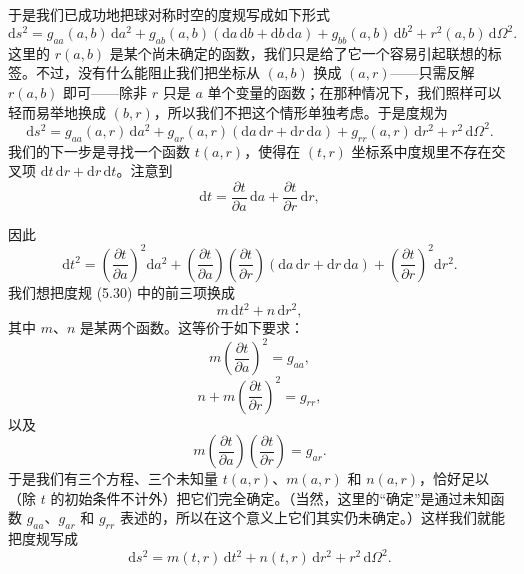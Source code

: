 于是我们已成功地把球对称时空的度规写成如下形式
\begin{equation*}
\mathrm{d}s^2 = g_{aa}(a, b)\,\mathrm{d}a^2 + g_{ab}(a, b)(\mathrm{d}a\,\mathrm{d}b + \mathrm{d}b\,\mathrm{d}a) + g_{bb}(a, b)\,\mathrm{d}b^2 + r^2(a, b)\,\mathrm{d}\Omega^2.
\tag{5.29}
\end{equation*}
这里的 $r(a, b)$ 是某个尚未确定的函数，我们只是给了它一个容易引起联想的标签。不过，没有什么能阻止我们把坐标从 $(a, b)$ 换成 $(a, r)$——只需反解 $r(a, b)$ 即可——除非 $r$ 只是 $a$ 单个变量的函数；在那种情况下，我们照样可以轻而易举地换成 $(b, r)$，所以我们不把这个情形单独考虑。于是度规为
\begin{equation*}
\mathrm{d}s^2 = g_{aa}(a, r)\,\mathrm{d}a^2 + g_{ar}(a, r)(\mathrm{d}a\,\mathrm{d}r + \mathrm{d}r\,\mathrm{d}a) + g_{rr}(a, r)\,\mathrm{d}r^2 + r^2\,\mathrm{d}\Omega^2.
\tag{5.30}
\end{equation*}
我们的下一步是寻找一个函数 $t(a, r)$，使得在 $(t, r)$ 坐标系中度规里不存在交叉项 $\mathrm{d}t\,\mathrm{d}r + \mathrm{d}r\,\mathrm{d}t$。注意到
\begin{equation*}
\mathrm{d}t = \frac{\partial t}{\partial a}\,\mathrm{d}a + \frac{\partial t}{\partial r}\,\mathrm{d}r,
\tag{5.31}
\end{equation*}

因此
\begin{equation*}
\mathrm{d}t^2 = \left(\frac{\partial t}{\partial a}\right)^{2}\mathrm{d}a^2 + \left(\frac{\partial t}{\partial a}\right)\left(\frac{\partial t}{\partial r}\right)(\mathrm{d}a\,\mathrm{d}r + \mathrm{d}r\,\mathrm{d}a) + \left(\frac{\partial t}{\partial r}\right)^{2}\mathrm{d}r^2.
\tag{5.32}
\end{equation*}
我们想把度规 (5.30) 中的前三项换成
\begin{equation*}
m\,\mathrm{d}t^2 + n\,\mathrm{d}r^2,
\tag{5.33}
\end{equation*}
其中 $m$、$n$ 是某两个函数。这等价于如下要求：
\begin{equation*}
m\left(\frac{\partial t}{\partial a}\right)^{2} = g_{aa},
\tag{5.34}
\end{equation*}
\begin{equation*}
n + m\left(\frac{\partial t}{\partial r}\right)^{2} = g_{rr},
\tag{5.35}
\end{equation*}
以及
\begin{equation*}
m\left(\frac{\partial t}{\partial a}\right)\left(\frac{\partial t}{\partial r}\right) = g_{ar}.
\tag{5.36}
\end{equation*}
于是我们有三个方程、三个未知量 $t(a, r)$、$m(a, r)$ 和 $n(a, r)$，恰好足以（除 $t$ 的初始条件不计外）把它们完全确定。（当然，这里的“确定”是通过未知函数 $g_{aa}$、$g_{ar}$ 和 $g_{rr}$ 表述的，所以在这个意义上它们其实仍未确定。）这样我们就能把度规写成
\begin{equation*}
\mathrm{d}s^2 = m(t, r)\,\mathrm{d}t^2 + n(t, r)\,\mathrm{d}r^2 + r^2\,\mathrm{d}\Omega^2.
\tag{5.37}
\end{equation*}

